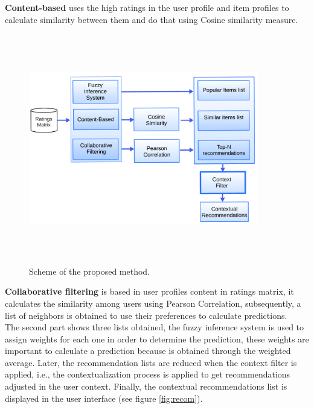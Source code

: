 \textbf{Content-based} uses the high ratings in the user profile and item
profiles to calculate similarity between them and do that using Cosine
similarity measure.
\begin{figure}
\captionsetup{font=footnotesize}
\centering 
\includegraphics[width=10cm,height=10cm,keepaspectratio]{img/archit.png}
\caption{Scheme of the proposed method.}
\label{fig:archit}  
\end{figure}
\textbf{Collaborative filtering} is based in user profiles content in
ratings matrix, it calculates the similarity among  users using
Pearson Correlation, subsequently,  a list of neighbors is obtained to
use their preferences to calculate predictions.\\
The second part shows three lists obtained, the fuzzy inference system
is used to assign weights for each one in order to determine the
prediction, these weights are important to calculate a
prediction because is obtained through the weighted average.
Later, the recommendation lists are reduced when the context filter is
applied, i.e., the contextualization process is applied to get
recommendations adjusted in the user context. 
Finally, the contextual recommendations list is displayed in the 
user interface (see figure \ref{fig:recom}).

